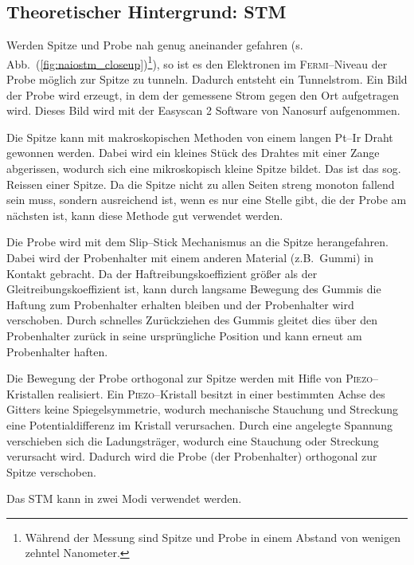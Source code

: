 \documentclass[sn-mathphys-num,iicol]{sn-jnl}
\theoremstyle{thmstyleone}
\theoremstyle{thmstyletwo}
\theoremstyle{thmstylethree}
\begin{document}
\subsection{Theoretischer Hintergrund: STM}
Werden Spitze und Probe nah genug aneinander gefahren (s. Abb.\ (\ref{fig:naiostm_closeup})\footnote{Während der Messung sind Spitze und Probe in einem Abstand von wenigen zehntel Nanometer.}), so ist es den Elektronen im \textsc{Fermi}--Niveau der Probe möglich zur Spitze zu tunneln.
Dadurch entsteht ein Tunnelstrom.
Ein Bild der Probe wird erzeugt, in dem der gemessene Strom gegen den Ort aufgetragen wird.
Dieses Bild wird mit der \glqq Easyscan 2\grqq{} Software von Nanosurf aufgenommen.

Die Spitze kann mit makroskopischen Methoden von einem langen Pt--Ir Draht gewonnen werden.
Dabei wird ein kleines Stück des Drahtes mit einer Zange abgerissen, wodurch sich eine mikroskopisch kleine Spitze bildet. Das ist das sog. Reissen einer Spitze.
Da die Spitze nicht zu allen Seiten streng monoton fallend sein muss, sondern ausreichend ist, wenn es nur eine Stelle gibt, die der Probe am nächsten ist, kann diese Methode gut verwendet werden. %

Die Probe wird mit dem Slip--Stick Mechanismus an die Spitze herangefahren.
Dabei wird der Probenhalter mit einem anderen Material (z.B.\ Gummi) in Kontakt gebracht.
Da der Haftreibungskoeffizient größer als der Gleitreibungskoeffizient ist, kann durch langsame Bewegung des Gummis die Haftung zum Probenhalter erhalten bleiben und der Probenhalter wird verschoben.
Durch schnelles Zurückziehen des Gummis gleitet dies über den Probenhalter zurück in seine ursprüngliche Position und kann erneut am Probenhalter haften.

Die Bewegung der Probe orthogonal zur Spitze werden mit Hifle von \textsc{Piezo}--Kristallen realisiert.
Ein \textsc{Piezo}--Kristall besitzt in einer bestimmten Achse des Gitters keine Spiegelsymmetrie, wodurch mechanische Stauchung und Streckung eine Potentialdifferenz im Kristall verursachen.
Durch eine angelegte Spannung verschieben sich die Ladungsträger, wodurch eine Stauchung oder Streckung verursacht wird.
Dadurch wird die Probe (der Probenhalter) orthogonal zur Spitze verschoben.

Das STM kann in zwei Modi verwendet werden.
\end{document}
